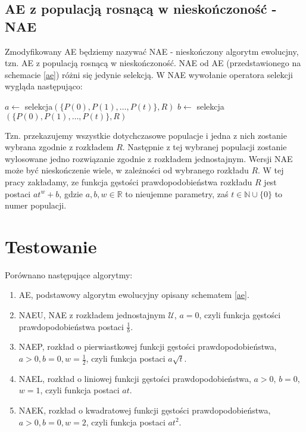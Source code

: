 \documentclass[12pt, a4paper]{article}
\begin{document}
\subsection{AE z populacją rosnącą w nieskończoność - NAE}

Zmodyfikowany AE będziemy nazywać NAE - nieskończony algorytm ewolucjny, tzn. AE z populacją rosnącą w nieskończoność.
NAE od AE (przedstawionego na schemacie \ref{ae}) różni się jedynie selekcją. W NAE wywołanie operatora selekcji wygląda następująco:

\begin{algorithm}[!htb]
\begin{algorithmic}[1] 
  \State $a \gets$ selekcja$(\{P(0), P(1), \dots, P(t)\}, R)$
  \State $b \gets$ selekcja$(\{P(0), P(1), \dots, P(t)\}, R)$
\end{algorithmic}
\end{algorithm}

Tzn. przekazujemy wszystkie dotychczasowe populacje i jedna z nich zostanie wybrana zgodnie z rozkładem $R$.
Następnie z tej wybranej populacji zostanie wylosowane jedno rozwiązanie zgodnie z rozkładem jednostajnym.
Wersji NAE może być nieskończenie wiele, w zależności od wybranego rozkładu $R$. 
W tej pracy zakładamy, ze funkcja gęstości prawdopodobieństwa rozkładu $R$ jest postaci $at^w + b$, gdzie
$a, b, w \in \mathbb{R}$ to nieujemne parametry, zaś $t \in \mathbb{N} \cup \{0\}$ to numer populacji. 

\section{Testowanie}

Porównano następujące algorytmy:

\begin{enumerate}
 \item AE, podstawowy algorytm ewolucyjny opisany schematem \ref{ae}.
 \item NAEU, NAE z rozkładem jednostajnym $\mathcal{U}$, $a=0$,
czyli funkcja gęstości prawdopodobieństwa postaci $\frac{1}{b}$. 
 \item NAEP, rozkład o pierwiastkowej funkcji gęstości prawdopodobieństwa, \\$a>0, b=0, w=\frac{1}{2}$,
czyli funkcja postaci $a\sqrt{t}$.
 \item NAEL, rozkład o liniowej funkcji gęstości prawdopodobieństwa, $a>0$, $b=0$, $w=1$,
czyli funkcja postaci $at$.
 \item NAEK, rozkład o kwadratowej funkcji gęstości prawdopodobieństwa, \\$a>0, b=0, w=2$,
czyli funkcja postaci $at^2$.
\end{enumerate}
\end{document}
